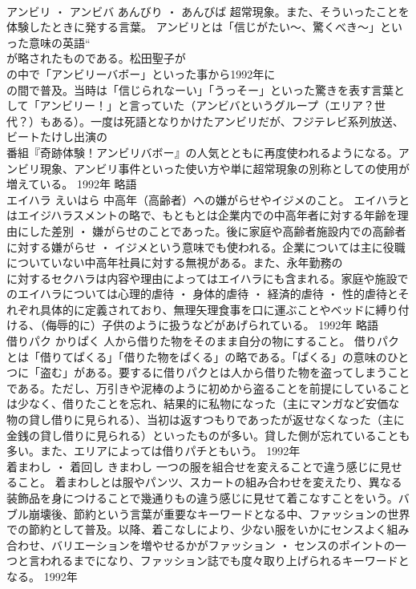 \documentclass[8pt]{extreport}
\begin{document}
\begin{CJK}{UTF8}{min}
\\	アンビリ ・ アンビバ	あんびり ・ あんびば	超常現象。また、そういったことを体験したときに発する言葉。	アンビリとは「信じがたい～、驚くべき～」といった意味の英語“
\\	が略されたものである。松田聖子が
\\	の中で「アンビリーバボー」といった事から1992年に
\\	の間で普及。当時は「信じられなーい」「うっそー」といった驚きを表す言葉として「アンビリー！」と言っていた（アンビバというグループ（エリア？世代？）もある）。一度は死語となりかけたアンビリだが、フジテレビ系列放送、ビートたけし出演の
\\	番組『奇跡体験！アンビリバボー』の人気とともに再度使われるようになる。アンビリ現象、アンビリ事件といった使い方や単に超常現象の別称としての使用が増えている。	1992年	略語	
\\	エイハラ	えいはら	中高年（高齢者）への嫌がらせやイジメのこと。	エイハラとはエイジハラスメントの略で、もともとは企業内での中高年者に対する年齢を理由にした差別 ・ 嫌がらせのことであった。後に家庭や高齢者施設内での高齢者に対する嫌がらせ ・ イジメという意味でも使われる。企業については主に役職についていない中高年社員に対する無視がある。また、永年勤務の
\\	に対するセクハラは内容や理由によってはエイハラにも含まれる。家庭や施設でのエイハラについては心理的虐待 ・ 身体的虐待 ・ 経済的虐待 ・ 性的虐待とそれぞれ具体的に定義されており、無理矢理食事を口に運ぶことやベッドに縛り付ける、（侮辱的に）子供のように扱うなどがあげられている。	1992年	略語	
\\	借りパク	かりぱく	人から借りた物をそのまま自分の物にすること。	借りパクとは「借りてぱくる」「借りた物をぱくる」の略である。「ぱくる」の意味のひとつに「盗む」がある。要するに借りパクとは人から借りた物を盗ってしまうことである。ただし、万引きや泥棒のように初めから盗ることを前提にしていることは少なく、借りたことを忘れ、結果的に私物になった（主にマンガなど安価な物の貸し借りに見られる）、当初は返すつもりであったが返せなくなった（主に金銭の貸し借りに見られる）といったものが多い。貸した側が忘れていることも多い。また、エリアによっては借りパチともいう。	1992年	
\\	着まわし ・ 着回し	きまわし	一つの服を組合せを変えることで違う感じに見せること。	着まわしとは服やパンツ、スカートの組み合わせを変えたり、異なる装飾品を身につけることで幾通りもの違う感じに見せて着こなすことをいう。バブル崩壊後、節約という言葉が重要なキーワードとなる中、ファッションの世界での節約として普及。以降、着こなしにより、少ない服をいかにセンスよく組み合わせ、バリエーションを増やせるかがファッション ・ センスのポイントの一つと言われるまでになり、ファッション誌でも度々取り上げられるキーワードとなる。	1992年	

\end{CJK}
\end{document}
